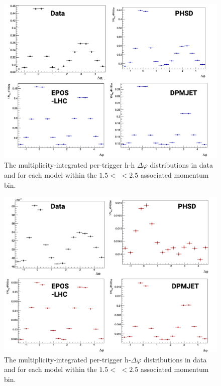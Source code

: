 \begin{figure}
\centering
\includegraphics[width=\textwidth]{figures/results/h_h_1d_modelcomp.png}
\caption{The multiplicity-integrated per-trigger h-h $\Delta\varphi$ distributions in data and for each model within the $1.5 <$ \pt $< 2.5$ \GeVc associated momentum bin.}
\label{fig:h_h_1d_model}
\end{figure}

\begin{figure}
\centering
\includegraphics[width=\textwidth]{figures/results/h_lambda_1d_modelcomp.png}
\caption{The multiplicity-integrated per-trigger h-\lmb $\Delta\varphi$ distributions in data and for each model within the $1.5 <$ \pt $< 2.5$ \GeVc associated momentum bin.}
\label{fig:h_lambda_1d_model}
\end{figure}

